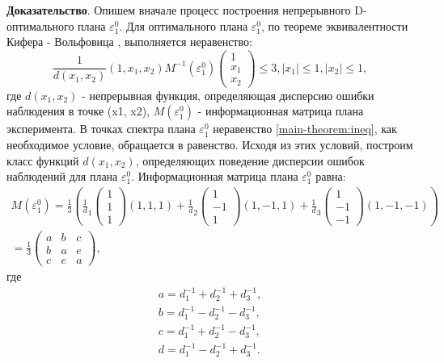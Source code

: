 \textbf{Доказательство}.
Опишем вначале процесс построения непрерывного D-оптимального плана $\varepsilon_1^0$.
Для оптимального плана  $\varepsilon_1^{0}$, по теореме эквивалентности Кифера - Вольфовица \cite{fedorov}, выполняется неравенство:
\begin{equation}\label{main-theorem:ineq}
\frac 1 {d(x_1, x_2)}
(1, x_1, x_2)
M^{-1}(\varepsilon_1^0)
\begin{pmatrix}1 \\ x_1 \\ x_2 \end{pmatrix} \le 3,
|x_1| \le 1, |x_2| \le 1,
\end{equation}
где $d(x_1, x_2)$ - непрерывная функция, определяющая дисперсию ошибки наблюдения в точке (x1, x2), $M(\varepsilon_1^{0})$ - информационная матрица плана эксперимента. В точках спектра плана $\varepsilon_1^{0}$ неравенство \eqref{main-theorem:ineq}, как необходимое условие, обращается в равенство. Исходя из этих условий, построим класс функций $d(x_1, x_2)$, определяющих поведение дисперсии ошибок наблюдений  для плана $\varepsilon_1^{0}$. Информационная матрица плана $\varepsilon_1^{0}$ равна:
\begin{gather*}
M(\varepsilon_1^0) = \frac 1 3 \left(
\frac 1 d_1 \begin{pmatrix} 1 \\ 1 \\ 1 \end{pmatrix} (1, 1, 1) + 
\frac 1 d_2 \begin{pmatrix} 1 \\ -1 \\ 1 \end{pmatrix} (1, -1, 1) + 
\frac 1 d_3 \begin{pmatrix} 1 \\ -1 \\ -1 \end{pmatrix} (1, -1, -1)
\right) \\ =
\frac 1 3 
\begin{pmatrix}
a & b & c \\
b & a & e \\
c & e & a
\end{pmatrix},
\end{gather*}
где
\begin{equation}\label{main-theorem:defs} \begin{split}
a=d_1^{-1}+d_2^{-1}+d_3^{-1},\\
b=d_1^{-1}-d_2^{-1}-d_3^{-1},\\
c=d_1^{-1}+d_2^{-1}-d_3^{-1},\\
d=d_1^{-1}-d_2^{-1}+d_3^{-1}.
\end{split}\end{equation}
